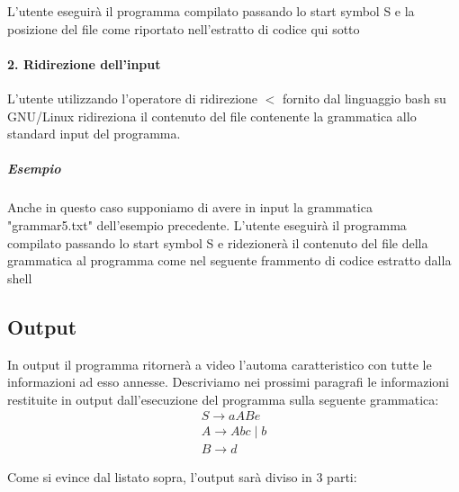 \documentclass[12pt]{article}
\begin{document}
L'utente eseguirà il programma compilato passando lo start symbol S e la posizione del file come riportato nell'estratto di codice qui sotto


\paragraph{2. Ridirezione dell'input}L'utente utilizzando l'operatore di ridirezione $<$ fornito dal linguaggio bash su GNU/Linux ridireziona il contenuto del file contenente la grammatica allo standard input del programma. 

\subparagraph{Esempio}
Anche in questo caso supponiamo di avere in input la grammatica "grammar5.txt" dell'esempio precedente. L'utente eseguirà il programma compilato passando lo start symbol S e ridezionerà il contenuto del file della grammatica al programma come nel seguente frammento di codice estratto dalla shell



\subsection{Output}\label{output}
In output il programma ritornerà a video l'automa caratteristico con tutte le informazioni ad esso annesse. Descriviamo nei prossimi paragrafi le informazioni restituite in output dall'esecuzione del programma sulla seguente grammatica: 
\begin{align*}
    S \to aABe \\
	A \to Abc \mid b \\
	B \to d 
\end{align*}



Come si evince dal listato sopra, l'output sarà diviso in 3 parti:
\end{document}
